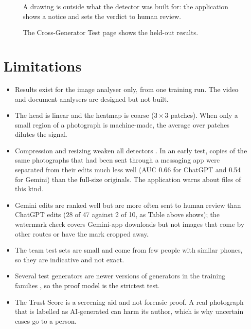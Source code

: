 \begin{figure}[htbp]
  \centering
  \caption{A drawing is outside what the detector was built for: the application shows a notice and sets the verdict to human review.}\label{fig:ui5}
\end{figure}

\begin{figure}[htbp]
  \centering
  \caption{The Cross-Generator Test page shows the held-out results.}\label{fig:ui6}
\end{figure}

\section{Limitations}
\begin{itemize}
  \item Results exist for the image analyser only, from one training run. The video and document analysers are designed but not built.
  \item The head is linear and the heatmap is coarse ($3\times3$ patches). When only a small region of a photograph is machine-made, the average over patches dilutes the signal.
  \item Compression and resizing weaken all detectors \cite{corvi}. In an early test, copies of the same photographs that had been sent through a messaging app were separated from their edits much less well (AUC 0.66 for ChatGPT and 0.54 for Gemini) than the full-size originals. The application warns about files of this kind.
  \item Gemini edits are ranked well but are more often sent to human review than ChatGPT edits (28 of 47 against 2 of 10, as Table above shows); the watermark check covers Gemini-app downloads but not images that come by other routes or have the mark cropped away.
  \item The team test sets are small and come from few people with similar phones, so they are indicative and not exact.
  \item Several test generators are newer versions of generators in the training families \cite{openfake}, so the proof model is the strictest test.
  \item The Trust Score is a screening aid and not forensic proof. A real photograph that is labelled as AI-generated can harm its author, which is why uncertain cases go to a person.
\end{itemize}
